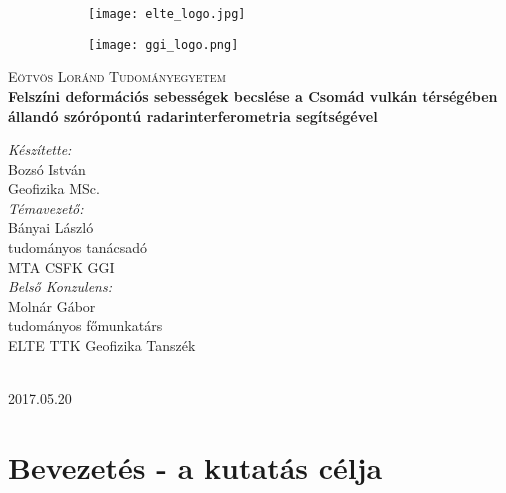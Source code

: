 \documentclass[12pt]{report}
\numberwithin{equation}{section}
\numberwithin{table}{section}
\numberwithin{figure}{section}
\begin{document}
\begin{titlepage}

\begin{center}
    \begin{figure}
        \begin{subfigure}{.49\linewidth}
            \centering
            \texttt{[image: elte\_logo.jpg]}
        \end{subfigure}%
        \begin{subfigure}{.49\linewidth}
            \centering
            \texttt{[image: ggi\_logo.png]}
        \end{subfigure}
    \end{figure}
\end{center}

    \center \textsc{\LARGE Eötvös Loránd Tudományegyetem}\\[1.5cm] {\huge \bfseries Felszíni deformációs sebességek becslése a Csomád vulkán térségében állandó szórópontú radarinterferometria segítségével\\[0.35cm]
    }

    \vspace{60pt}

    \begin{minipage}{0.4\textwidth}
        \emph{Készítette:}\\ Bozsó István\\ Geofizika MSc.\\

        \emph{Témavezető:} \\ Bányai László\\
        tudományos tanácsadó\\ MTA CSFK GGI\\

        \emph{Belső Konzulens:} \\ Molnár Gábor\\
        tudományos főmunkatárs\\ ELTE TTK Geofizika Tanszék
    \end{minipage}\\[1cm] 2017.05.20
\end{titlepage}

\tableofcontents

\chapter*{Bevezetés - a kutatás célja}
\end{document}
